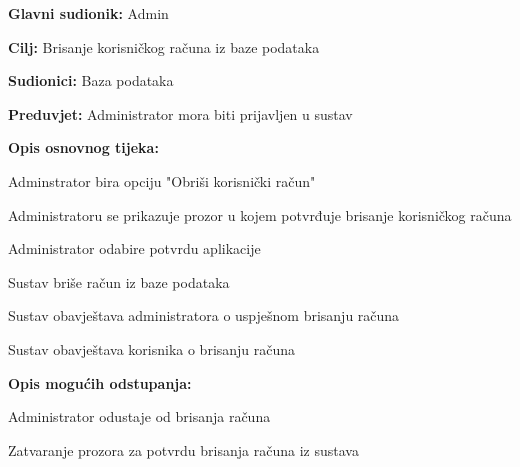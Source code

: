 					\noindent {}
					\begin{packed_item}
	                   
						\item \textbf{Glavni sudionik: } Admin
						\item  \textbf{Cilj:} Brisanje korisničkog računa iz baze podataka
						\item  \textbf{Sudionici:} Baza podataka
						\item  \textbf{Preduvjet:} Administrator mora biti prijavljen u sustav
						\item  \textbf{Opis osnovnog tijeka:}
						
						\item[] \begin{packed_enum}
	
							\item Adminstrator bira opciju "Obriši korisnički račun"
							\item Administratoru se prikazuje prozor u kojem potvrđuje brisanje korisničkog računa
                            \item Administrator odabire potvrdu aplikacije
							\item Sustav briše račun iz baze podataka
							\item Sustav obavještava administratora o uspješnom brisanju računa
							\item Sustav obavještava korisnika o brisanju računa
							
						\end{packed_enum}
						\item  \textbf{Opis mogućih odstupanja:}
						\item[] \begin{packed_item}
	
							\item[3.a] Administrator odustaje od brisanja računa
							\item[] \begin{packed_enum}

                                \item Zatvaranje prozora za potvrdu brisanja računa iz sustava

							\end{packed_enum}
							
						\end{packed_item}
      
					\end{packed_item}

